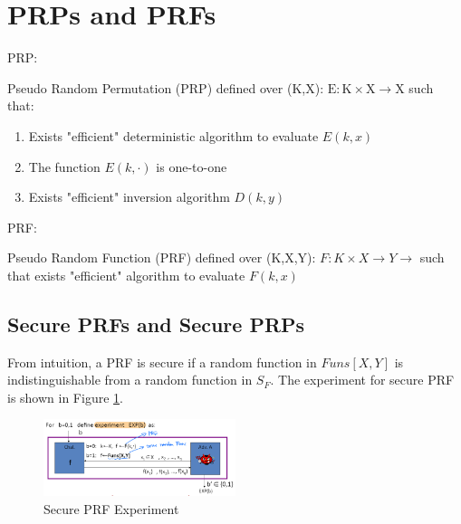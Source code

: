 

\section{PRPs and PRFs}

\begin{definition} [PRP] PRP: 

    Pseudo Random Permutation (PRP) defined over (K,X):
    $\mathrm{E}: \mathrm{K} \times \mathrm{X} \rightarrow \mathrm{X}$
    such that:
    \begin{enumerate} [itemsep=2pt,topsep=0pt,parsep=0pt]
        \item Exists "efficient" deterministic algorithm to evaluate $E(k, x)$
        \item The function $E(k, \cdot)$ is one-to-one
        \item Exists "efficient" inversion algorithm $D(k, y)$
    \end{enumerate}
    
\end{definition}


\begin{definition} [PRF] PRF:

    Pseudo Random Function (PRF) defined over (K,X,Y):
    $F: K \times X \rightarrow Y \rightarrow$ 
    such that exists "efficient" algorithm to evaluate $F(k, x)$

\end{definition}

\subsection{Secure PRFs and Secure PRPs}

From intuition, a PRF is secure if a random function in $Funs[X,Y]$ is indistinguishable from a random function in $S_F$. The experiment for secure PRF is shown in Figure \ref{fig: 03 Secure PRF Experiment}.

\begin{figure}[h]
    \centering
    \includegraphics[width=0.5\textwidth]{Stanford_Crypto_1/fig/03_block_cipher/Secure PRF Experiment.png}
    \caption{Secure PRF Experiment}
    \label{fig: 03 Secure PRF Experiment}
\end{figure}

